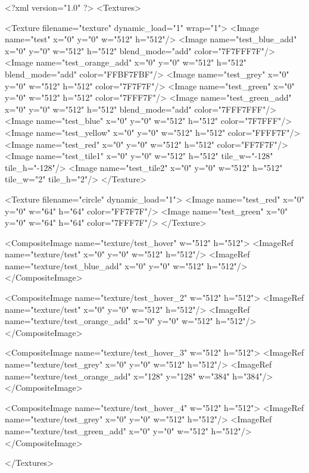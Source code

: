 <?xml version="1.0" ?>
<Textures>

	<Texture filename="texture" dynamic_load="1" wrap="1">
		<Image name="test" x="0" y="0" w="512" h="512"/>
		<Image name="test_blue_add" x="0" y="0" w="512" h="512" blend_mode="add" color="7F7FFF7F"/>
		<Image name="test_orange_add" x="0" y="0" w="512" h="512" blend_mode="add" color="FFBF7FBF"/>
		<Image name="test_grey" x="0" y="0" w="512" h="512" color="7F7F7F"/>
		<Image name="test_green" x="0" y="0" w="512" h="512" color="7FFF7F"/>
		<Image name="test_green_add" x="0" y="0" w="512" h="512" blend_mode="add" color="7FFF7FFF"/>
		<Image name="test_blue" x="0" y="0" w="512" h="512" color="7F7FFF"/>
		<Image name="test_yellow" x="0" y="0" w="512" h="512" color="FFFF7F"/>
		<Image name="test_red" x="0" y="0" w="512" h="512" color="FF7F7F"/>
		<Image name="test_tile1" x="0" y="0" w="512" h="512" tile_w="-128" tile_h="-128"/>
		<Image name="test_tile2" x="0" y="0" w="512" h="512" tile_w="2" tile_h="2"/>
	</Texture>
	
	<Texture filename="circle" dynamic_load="1">
		<Image name="test_red" x="0" y="0" w="64" h="64" color="FF7F7F"/>
		<Image name="test_green" x="0" y="0" w="64" h="64" color="7FFF7F"/>
	</Texture>
	
	<CompositeImage name="texture/test_hover" w="512" h="512">
		<ImageRef name="texture/test" x="0" y="0" w="512" h="512"/>
		<ImageRef name="texture/test_blue_add" x="0" y="0" w="512" h="512"/>
	</CompositeImage>
	
	<CompositeImage name="texture/test_hover_2" w="512" h="512">
		<ImageRef name="texture/test" x="0" y="0" w="512" h="512"/>
		<ImageRef name="texture/test_orange_add" x="0" y="0" w="512" h="512"/>
	</CompositeImage>
	
	<CompositeImage name="texture/test_hover_3" w="512" h="512">
		<ImageRef name="texture/test_grey" x="0" y="0" w="512" h="512"/>
		<ImageRef name="texture/test_orange_add" x="128" y="128" w="384" h="384"/>
	</CompositeImage>
	
	<CompositeImage name="texture/test_hover_4" w="512" h="512">
		<ImageRef name="texture/test_grey" x="0" y="0" w="512" h="512"/>
		<ImageRef name="texture/test_green_add" x="0" y="0" w="512" h="512"/>
	</CompositeImage>
	
</Textures>
